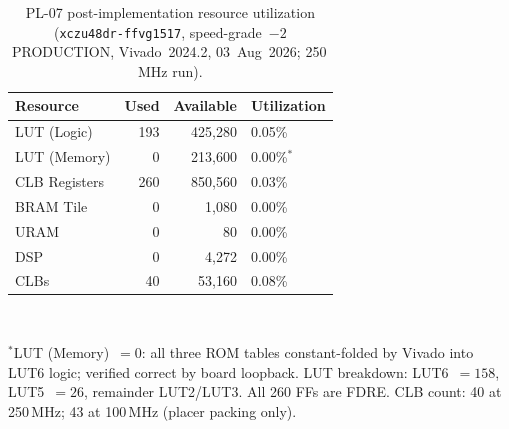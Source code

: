 \begin{table}[!h]
  \caption{PL-07 post-implementation resource utilization
           (\texttt{xczu48dr-ffvg1517}, speed-grade~$-2$ PRODUCTION,
           Vivado~2024.2, 03~Aug~2026; 250\,MHz run).}
  \label{tab:pl07_resources}
  \centering
  \begin{tabular}{lrrl}
    \hline
    Resource        & Used  & Available   & Utilization \\
    \hline
    LUT (Logic)     & 193   & 425{,}280   & 0.05\%       \\
    LUT (Memory)    & 0     & 213{,}600   & 0.00\%$^{*}$ \\
    CLB Registers   & 260   & 850{,}560   & 0.03\%       \\
    BRAM Tile       & 0     & 1{,}080     & 0.00\%       \\
    URAM            & 0     & 80          & 0.00\%       \\
    DSP             & 0     & 4{,}272     & 0.00\%       \\
    CLBs            & 40    & 53{,}160    & 0.08\%       \\
    \hline
  \end{tabular}\\[4pt]
  \begin{minipage}{\linewidth}
    \small
    $^{*}$LUT (Memory)~$= 0$: all three ROM tables constant-folded by Vivado
    into LUT6 logic; verified correct by board loopback.
    LUT breakdown: LUT6~$= 158$, LUT5~$= 26$, remainder LUT2/LUT3.
    All 260 FFs are FDRE.
    CLB count: 40 at 250\,MHz; 43 at 100\,MHz (placer packing only).
  \end{minipage}
\end{table}

\vspace{-30pt}\leavevmode\par

